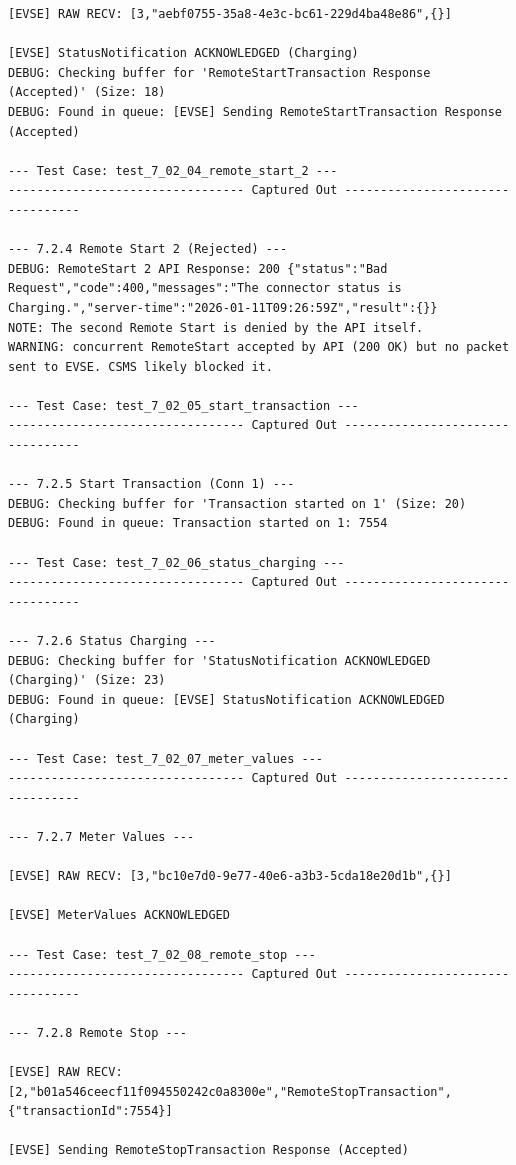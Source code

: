 \documentclass{article}
\begin{document}
\begin{lstlisting}
[EVSE] RAW RECV: [3,"aebf0755-35a8-4e3c-bc61-229d4ba48e86",{}]

[EVSE] StatusNotification ACKNOWLEDGED (Charging)
DEBUG: Checking buffer for 'RemoteStartTransaction Response (Accepted)' (Size: 18)
DEBUG: Found in queue: [EVSE] Sending RemoteStartTransaction Response (Accepted)

--- Test Case: test_7_02_04_remote_start_2 ---
--------------------------------- Captured Out ---------------------------------

--- 7.2.4 Remote Start 2 (Rejected) ---
DEBUG: RemoteStart 2 API Response: 200 {"status":"Bad Request","code":400,"messages":"The connector status is Charging.","server-time":"2026-01-11T09:26:59Z","result":{}}
NOTE: The second Remote Start is denied by the API itself.
WARNING: concurrent RemoteStart accepted by API (200 OK) but no packet sent to EVSE. CSMS likely blocked it.

--- Test Case: test_7_02_05_start_transaction ---
--------------------------------- Captured Out ---------------------------------

--- 7.2.5 Start Transaction (Conn 1) ---
DEBUG: Checking buffer for 'Transaction started on 1' (Size: 20)
DEBUG: Found in queue: Transaction started on 1: 7554

--- Test Case: test_7_02_06_status_charging ---
--------------------------------- Captured Out ---------------------------------

--- 7.2.6 Status Charging ---
DEBUG: Checking buffer for 'StatusNotification ACKNOWLEDGED (Charging)' (Size: 23)
DEBUG: Found in queue: [EVSE] StatusNotification ACKNOWLEDGED (Charging)

--- Test Case: test_7_02_07_meter_values ---
--------------------------------- Captured Out ---------------------------------

--- 7.2.7 Meter Values ---

[EVSE] RAW RECV: [3,"bc10e7d0-9e77-40e6-a3b3-5cda18e20d1b",{}]

[EVSE] MeterValues ACKNOWLEDGED

--- Test Case: test_7_02_08_remote_stop ---
--------------------------------- Captured Out ---------------------------------

--- 7.2.8 Remote Stop ---

[EVSE] RAW RECV: [2,"b01a546ceecf11f094550242c0a8300e","RemoteStopTransaction",{"transactionId":7554}]

[EVSE] Sending RemoteStopTransaction Response (Accepted)


\end{lstlisting}
\end{document}
